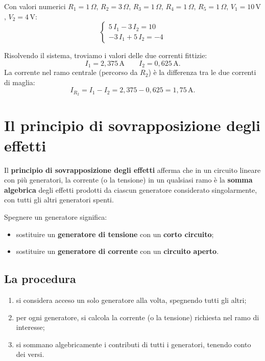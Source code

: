 \begin{esempio}
Con valori numerici \(R_1 = 1\,\Omega\), \(R_2 = 3\,\Omega\), \(R_3 = 1\,\Omega\), \(R_4 = 1\,\Omega\), \(R_5 = 1\,\Omega\), \(V_1 = 10\,\text{V}\), \(V_2 = 4\,\text{V}\):
\[
\begin{cases}
5\,I_1 - 3\,I_2 = 10 \\
-3\,I_1 + 5\,I_2 = -4
\end{cases}
\]

Risolvendo il sistema, troviamo i valori delle due correnti fittizie:
\[
I_1 = 2{,}375\,\text{A} \qquad I_2 = 0{,}625\,\text{A}.
\]
La corrente nel ramo centrale (percorso da \(R_2\)) è la differenza tra le due correnti di maglia:
\[
I_{R_2} = I_1 - I_2 = 2{,}375 - 0{,}625 = 1{,}75\,\text{A}.
\]
\end{esempio}

\section{Il principio di sovrapposizione degli effetti}

\begin{concetto}
Il \textbf{principio di sovrapposizione degli effetti} afferma che in un circuito lineare con più generatori, la corrente (o la tensione) in un qualsiasi ramo è la \textbf{somma algebrica} degli effetti prodotti da ciascun generatore considerato singolarmente, con tutti gli altri generatori spenti.
\end{concetto}

Spegnere un generatore significa:
\begin{itemize}[leftmargin=1cm]
  \item sostituire un \textbf{generatore di tensione} con un \textbf{corto circuito};
  \item sostituire un \textbf{generatore di corrente} con un \textbf{circuito aperto}.
\end{itemize}

\subsection{La procedura}

\begin{enumerate}[leftmargin=1cm]
  \item si considera acceso un solo generatore alla volta, spegnendo tutti gli altri;
  \item per ogni generatore, si calcola la corrente (o la tensione) richiesta nel ramo di interesse;
  \item si sommano algebricamente i contributi di tutti i generatori, tenendo conto dei versi.
\end{enumerate}

